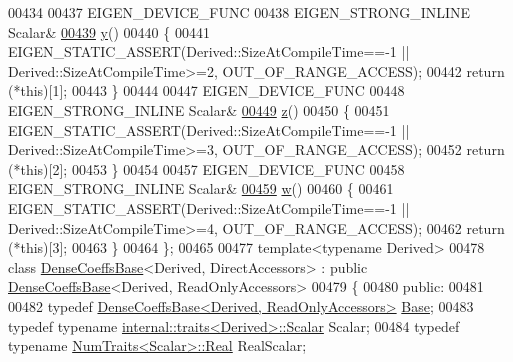 \begin{DoxyCode}
00434 
00437     EIGEN\_DEVICE\_FUNC
00438     EIGEN\_STRONG\_INLINE Scalar&
\hyperlink{group___core___module_ac04b8e2ab263c3901d72c5240ad017b5}{00439}     \hyperlink{group___core___module_ac04b8e2ab263c3901d72c5240ad017b5}{y}()
00440     \{
00441       EIGEN\_STATIC\_ASSERT(Derived::SizeAtCompileTime==-1 || Derived::SizeAtCompileTime>=2, 
      OUT\_OF\_RANGE\_ACCESS);
00442       \textcolor{keywordflow}{return} (*\textcolor{keyword}{this})[1];
00443     \}
00444 
00447     EIGEN\_DEVICE\_FUNC
00448     EIGEN\_STRONG\_INLINE Scalar&
\hyperlink{group___core___module_ad64b8fa3ee1cda9eb3df918eaf8b0396}{00449}     \hyperlink{group___core___module_ad64b8fa3ee1cda9eb3df918eaf8b0396}{z}()
00450     \{
00451       EIGEN\_STATIC\_ASSERT(Derived::SizeAtCompileTime==-1 || Derived::SizeAtCompileTime>=3, 
      OUT\_OF\_RANGE\_ACCESS);
00452       \textcolor{keywordflow}{return} (*\textcolor{keyword}{this})[2];
00453     \}
00454 
00457     EIGEN\_DEVICE\_FUNC
00458     EIGEN\_STRONG\_INLINE Scalar&
\hyperlink{group___core___module_a225a129a5f2d8863068bd5629a6144a6}{00459}     \hyperlink{group___core___module_a225a129a5f2d8863068bd5629a6144a6}{w}()
00460     \{
00461       EIGEN\_STATIC\_ASSERT(Derived::SizeAtCompileTime==-1 || Derived::SizeAtCompileTime>=4, 
      OUT\_OF\_RANGE\_ACCESS);
00462       \textcolor{keywordflow}{return} (*\textcolor{keyword}{this})[3];
00463     \}
00464 \};
00465 
00477 \textcolor{keyword}{template}<\textcolor{keyword}{typename} Derived>
00478 \textcolor{keyword}{class }\hyperlink{class_eigen_1_1_dense_coeffs_base}{DenseCoeffsBase}<Derived, DirectAccessors> : \textcolor{keyword}{public} 
      \hyperlink{class_eigen_1_1_dense_coeffs_base}{DenseCoeffsBase}<Derived, ReadOnlyAccessors>
00479 \{
00480   \textcolor{keyword}{public}:
00481 
00482     \textcolor{keyword}{typedef} \hyperlink{group___core___module_class_eigen_1_1_dense_coeffs_base_3_01_derived_00_01_read_only_accessors_01_4}{DenseCoeffsBase<Derived, ReadOnlyAccessors>} 
      \hyperlink{group___core___module_struct_eigen_1_1_eigen_base}{Base};
00483     \textcolor{keyword}{typedef} \textcolor{keyword}{typename} \hyperlink{struct_eigen_1_1internal_1_1traits}{internal::traits<Derived>::Scalar} Scalar;
00484     \textcolor{keyword}{typedef} \textcolor{keyword}{typename} \hyperlink{group___core___module_struct_eigen_1_1_num_traits}{NumTraits<Scalar>::Real} RealScalar;

\end{DoxyCode}
